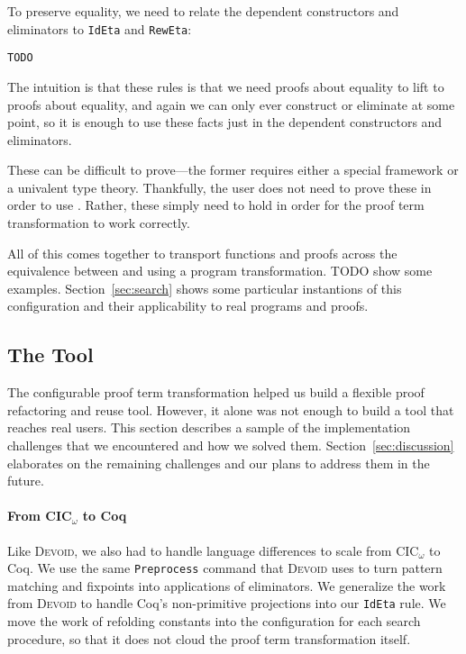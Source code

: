 To preserve equality, we need to relate the dependent constructors and eliminators to
\lstinline{IdEta} and \lstinline{RewEta}:

\begin{lstlisting}
TODO
\end{lstlisting}
The intuition is that these rules is that we need proofs about equality to lift to proofs about equality,
and again we can only ever construct or eliminate at some point, so it is enough
to use these facts just in the dependent constructors and eliminators.

These can be difficult to prove---the former requires either a special framework %
or a univalent type theory.
Thankfully, the user does not need to prove these in order to use \toolname.
Rather, these simply need to hold in order for the proof term transformation to work correctly.

All of this comes together to transport functions and proofs across the equivalence between \A and \B
using a program transformation.
TODO show some examples.
Section~\ref{sec:search} shows some particular instantions of this configuration and their applicability to real programs and proofs.

\subsection{The Tool}
\label{sec:implementation}


The configurable proof term transformation helped us build a flexible proof refactoring and reuse tool.
However, it alone was not enough to build a tool that reaches real users.
This section describes a sample of the implementation challenges that we encountered and how we solved them.
Section~\ref{sec:discussion} elaborates on the remaining challenges and our plans to address them in the future.

\paragraph{From CIC$_{\omega}$ to Coq}

Like \textsc{Devoid}, we also had to handle language differences to scale from CIC$_{\omega}$ to Coq.
We use the same \lstinline{Preprocess} command that \textsc{Devoid} uses to turn pattern matching and fixpoints into applications of eliminators.
We generalize the work from \textsc{Devoid} to handle Coq's non-primitive projections into our \lstinline{IdEta} rule.
We move the work of refolding constants into the configuration for each search procedure, so that it does not
cloud the proof term transformation itself.

